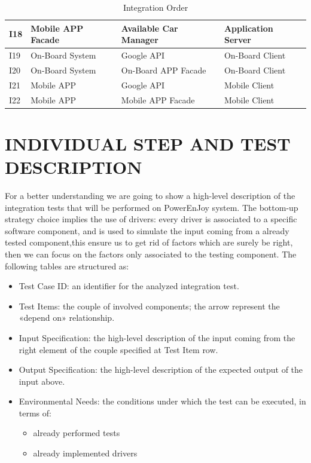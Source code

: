 \documentclass[a4paper,11pt]{article}
\begin{document}
\begin{table}[H]
\begin{center}
\begin{tabular}{|p{.5cm}|p{4cm}|p{4.5cm}|p{3.5cm}|}
 \hline
 I18&  Mobile APP Facade&Available Car Manager&Application Server\\
 \hline
 I19& On-Board System&Google API& On-Board Client \\
 \hline
 I20&  On-Board System&On-Board APP Facade&On-Board Client\\
 \hline
 I21&  Mobile APP&Google API& Mobile Client\\
 \hline
 I22&  Mobile APP&Mobile APP Facade& Mobile Client\\
 \hline
\end{tabular}
\caption{Integration Order}
\end{center}
\end{table}	

	
\newpage	
\section{INDIVIDUAL STEP AND TEST DESCRIPTION}
For a better understanding we are going to show a high-level description of the integration tests that will be performed on PowerEnJoy system. The bottom-up strategy choice implies the use of drivers: every driver is associated to a specific software component, and is used to simulate the input coming from a already tested component,this ensure us to get rid of factors which are surely be right, then we can focus on the factors only associated to the testing component.
The following tables are structured as:
\begin{itemize}
	\item Test Case ID: an identifier for the analyzed integration test.
	\item Test Items: the couple of involved components; the arrow represent the «depend on» relationship. 
 	\item Input Specification: the high-level description of the input coming from the right element of the couple specified at Test Item row.
	\item Output Specification: the high-level description of the expected output of the input above.
	\item Environmental Needs: the conditions under which the test can be executed, in terms of:
	\begin{itemize}
		\item already performed tests
		\item already implemented drivers
	\end{itemize}
\end{itemize}
\end{document}
